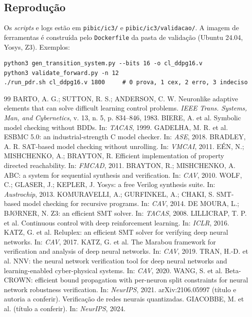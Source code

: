 \documentclass[12pt,openright,oneside,a4paper,chapter=TITLE,sumario=tradicional,english,brazil]{abntex2}
\begin{document}
\begin{apendicesenv}
\chapter{Reprodução}

Os \emph{scripts} e logs estão em \texttt{pibic/ic3/} e \texttt{pibic/ic3/validacao/}. A imagem de ferramentas é construída pelo \texttt{Dockerfile} da pasta de validação (Ubuntu 24.04, Yosys, Z3). Exemplos:

\begin{lstlisting}
python3 gen_transition_system.py --bits 16 -o cl_ddpg16.v
python3 validate_forward.py -n 12
./run_pdr.sh cl_ddpg16.v 1800     # 0 prova, 1 cex, 2 erro, 3 indeciso
\end{lstlisting}
\end{apendicesenv}

\begin{thebibliography}{99}
 BARTO, A. G.; SUTTON, R. S.; ANDERSON, C. W. Neuronlike adaptive elements that can solve difficult learning control problems. \emph{IEEE Trans. Systems, Man, and Cybernetics}, v. 13, n. 5, p. 834--846, 1983.
 BIERE, A. et al. Symbolic model checking without BDDs. In: \emph{TACAS}, 1999.
 GADELHA, M. R. et al. ESBMC 5.0: an industrial-strength C model checker. In: \emph{ASE}, 2018.
 BRADLEY, A. R. SAT-based model checking without unrolling. In: \emph{VMCAI}, 2011.
 EÉN, N.; MISHCHENKO, A.; BRAYTON, R. Efficient implementation of property directed reachability. In: \emph{FMCAD}, 2011.
 BRAYTON, R.; MISHCHENKO, A. ABC: a system for sequential synthesis and verification. In: \emph{CAV}, 2010.
 WOLF, C.; GLASER, J.; KEPLER, J. Yosys: a free Verilog synthesis suite. In: \emph{Austrochip}, 2013.
 KOMURAVELLI, A.; GURFINKEL, A.; CHAKI, S. SMT-based model checking for recursive programs. In: \emph{CAV}, 2014.
 DE MOURA, L.; BJØRNER, N. Z3: an efficient SMT solver. In: \emph{TACAS}, 2008.
 LILLICRAP, T. P. et al. Continuous control with deep reinforcement learning. In: \emph{ICLR}, 2016.
 KATZ, G. et al. Reluplex: an efficient SMT solver for verifying deep neural networks. In: \emph{CAV}, 2017.
 KATZ, G. et al. The Marabou framework for verification and analysis of deep neural networks. In: \emph{CAV}, 2019.
 TRAN, H.-D. et al. NNV: the neural network verification tool for deep neural networks and learning-enabled cyber-physical systems. In: \emph{CAV}, 2020.
 WANG, S. et al. Beta-CROWN: efficient bound propagation with per-neuron split constraints for neural network robustness verification. In: \emph{NeurIPS}, 2021.
 arXiv:2106.05997 (título e autoria a conferir). Verificação de redes neurais quantizadas.
 GIACOBBE, M. et al. (título a conferir). In: \emph{NeurIPS}, 2024.
\end{thebibliography}
\end{document}
